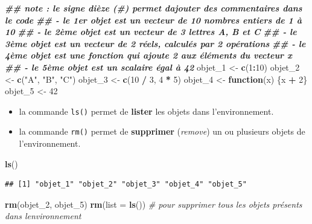 \documentclass[
]{book}
\newenvironment{Shaded}{\begin{snugshade}}{\end{snugshade}}
\newcommand{\AttributeTok}[1]{\textcolor[rgb]{0.13,0.29,0.53}{#1}}
\newcommand{\CommentTok}[1]{\textcolor[rgb]{0.56,0.35,0.01}{\textit{#1}}}
\newcommand{\ControlFlowTok}[1]{\textcolor[rgb]{0.13,0.29,0.53}{\textbf{#1}}}
\newcommand{\DecValTok}[1]{\textcolor[rgb]{0.00,0.00,0.81}{#1}}
\newcommand{\DocumentationTok}[1]{\textcolor[rgb]{0.56,0.35,0.01}{\textbf{\textit{#1}}}}
\newcommand{\FunctionTok}[1]{\textcolor[rgb]{0.13,0.29,0.53}{\textbf{#1}}}
\newcommand{\NormalTok}[1]{#1}
\newcommand{\OtherTok}[1]{\textcolor[rgb]{0.56,0.35,0.01}{#1}}
\newcommand{\SpecialCharTok}[1]{\textcolor[rgb]{0.81,0.36,0.00}{\textbf{#1}}}
\newcommand{\StringTok}[1]{\textcolor[rgb]{0.31,0.60,0.02}{#1}}
\providecommand{\tightlist}{%
  \setlength{\itemsep}{0pt}\setlength{\parskip}{0pt}}
\begin{document}
\begin{Shaded}
\begin{Highlighting}[]
\DocumentationTok{\#\# note : le signe dièze (\#) permet d\textquotesingle{}ajouter des commentaires dans le code  }
\DocumentationTok{\#\# {-} le 1er objet est un vecteur de 10 nombres entiers de 1 à 10}
\DocumentationTok{\#\# {-} le 2ème objet est un vecteur de 3 lettres A, B et C}
\DocumentationTok{\#\# {-} le 3ème objet est un vecteur de 2 réels, calculés par 2 opérations}
\DocumentationTok{\#\# {-} le 4ème objet est une fonction qui ajoute 2 aux éléments du vecteur x}
\DocumentationTok{\#\# {-} le 5ème objet est un scalaire égal à 42}
\NormalTok{objet\_1 }\OtherTok{\textless{}{-}} \FunctionTok{c}\NormalTok{(}\DecValTok{1}\SpecialCharTok{:}\DecValTok{10}\NormalTok{) }
\NormalTok{objet\_2 }\OtherTok{\textless{}{-}} \FunctionTok{c}\NormalTok{(}\StringTok{"A"}\NormalTok{, }\StringTok{"B"}\NormalTok{, }\StringTok{"C"}\NormalTok{) }
\NormalTok{objet\_3 }\OtherTok{\textless{}{-}} \FunctionTok{c}\NormalTok{(}\DecValTok{10} \SpecialCharTok{/} \DecValTok{3}\NormalTok{, }\DecValTok{4} \SpecialCharTok{*} \DecValTok{5}\NormalTok{) }
\NormalTok{objet\_4 }\OtherTok{\textless{}{-}} \ControlFlowTok{function}\NormalTok{(x) \{x }\SpecialCharTok{+} \DecValTok{2}\NormalTok{\} }
\NormalTok{objet\_5 }\OtherTok{\textless{}{-}} \DecValTok{42} 
\end{Highlighting}
\end{Shaded}

\begin{itemize}
\tightlist
\item
  la commande \texttt{ls()} permet de \textbf{lister} les objets dans l'environnement.
\item
  la commande \texttt{rm()} permet de \textbf{supprimer} (\emph{remove}) un ou plusieurs objets de l'environnement.
\end{itemize}

\begin{Shaded}
\begin{Highlighting}[]
\FunctionTok{ls}\NormalTok{()}
\end{Highlighting}
\end{Shaded}

\begin{verbatim}
## [1] "objet_1" "objet_2" "objet_3" "objet_4" "objet_5"
\end{verbatim}

\begin{Shaded}
\begin{Highlighting}[]
\FunctionTok{rm}\NormalTok{(objet\_2, objet\_5)}
\FunctionTok{rm}\NormalTok{(}\AttributeTok{list =} \FunctionTok{ls}\NormalTok{()) }\CommentTok{\# pour supprimer tous les objets présents dans l\textquotesingle{}environnement}
\end{Highlighting}
\end{Shaded}
\end{document}
